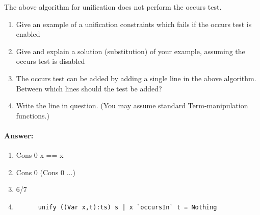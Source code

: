 \documentclass{article}
\newcommand{\answer}[0]{\paragraph{Answer:}}
\begin{document}
The above algorithm for unification does not perform the occurs test.

\begin{enumerate}
\item Give an example of a unification constraints which fails if the
  occurs test is enabled 
\item Give and explain a solution (substitution) of your example,
  assuming the occurs test is disabled 
\item The occurs test can be added by adding a single line in the
  above algorithm. Between which lines should the test be added?
\item Write the line in question. (You may assume standard
  Term-manipulation functions.) 
\end{enumerate}

\answer{
  \begin{enumerate}
  \item Cons 0 x == x
  \item Cons 0 (Cons 0 ...)
  \item 6/7
  \item 
    \begin{verbatim}
      unify ((Var x,t):ts) s | x `occursIn` t = Nothing
    \end{verbatim}
  \end{enumerate}
}
\end{document}
